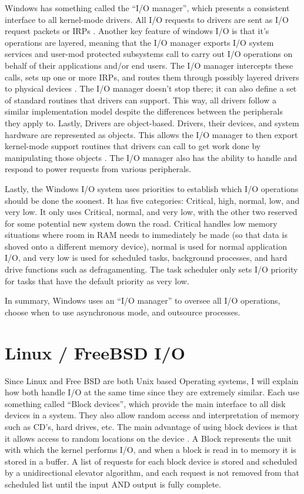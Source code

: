\documentclass[onecolumn, draftclsnofoot,10pt, compsoc]{IEEEtran}
\begin{document}
Windows has something called the “I/O manager”, which presents a consistent interface to all kernel-mode drivers. All I/O requests to drivers are sent as I/O request packets or IRPs \cite{WindowsDev}. Another key feature of windows I/O is that it’s operations are layered, meaning that the I/O manager exports I/O system services and user-mod protected subsystems call to carry out I/O operations on behalf of their applications and/or end users. The I/O manager intercepts these calls, sets up one or more IRPs, and routes them through possibly layered drivers to physical devices \cite{WindowsDev}. The I/O manager doesn’t stop there; it can also define a set of standard routines that drivers can support. This way, all drivers follow a similar implementation model despite the differences between the peripherals they apply to. Lastly, Drivers are object-based. Drivers, their devices, and system hardware are represented as objects. This allows the I/O manager to then export kernel-mode support routines that drivers can call to get work done by manipulating those objects \cite{WindowsDev}. The I/O manager also has the ability to handle and respond to power requests from various peripherals.  

Lastly, the Windows I/O system uses priorities to establish which I/O operations should be done the soonest. It has five categories: Critical, high, normal, low, and very low. It only uses Critical, normal, and very low, with the other two reserved for some potential new system down the road. Critical handles low memory situations where room in RAM needs to immediately be made (so that data is shoved onto a different memory device), normal is used for normal application I/O, and very low is used for scheduled tasks, background processes, and hard drive functions such as defragamenting. The task scheduler only sets I/O priority for tasks that have the default priority as very low. \cite{WindowIO}

In summary, Windows uses an “I/O manager” to oversee all I/O operations, choose when to use asynchronous mode, and outsource processes. 

\section{Linux / FreeBSD I/O}
Since Linux and Free BSD are both Unix based Operating systems, I will explain how both handle I/O at the same time since they are extremely similar. Each use something called “Block devices”, which provide the main interface to all disk devices in a system.  They also allow random access and interpretation of memory such as CD’s, hard drives, etc. The main advantage of using block devices is that it allows access to random locations on the device \cite{LinuxIO}. A Block represents the unit with which the kernel performs I/O, and when a block is read in to memory it is stored in a buffer. A list of requests for each block device is stored and scheduled by a unidirectional elevator algorithm, and each request is not removed from that scheduled list until the input AND output is fully complete. \cite{Memman} 
	
\end{document}

